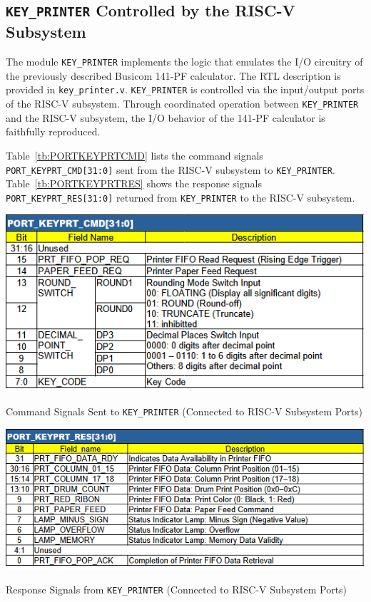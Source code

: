 \subsection{\texttt{KEY\_PRINTER} Controlled by the RISC-V Subsystem}
The module \texttt{KEY\_PRINTER} implements the logic that emulates the I/O circuitry of the previously described Busicom 141-PF calculator. The RTL description is provided in \texttt{key\_printer.v}. \texttt{KEY\_PRINTER} is controlled via the input/output ports of the RISC-V subsystem. Through coordinated operation between \texttt{KEY\_PRINTER} and the RISC-V subsystem, the I/O behavior of the 141-PF calculator is faithfully reproduced.

Table~\ref{tb:PORTKEYPRTCMD} lists the command signals \texttt{PORT\_KEYPRT\_CMD[31:0]} sent from the RISC-V subsystem to \texttt{KEY\_PRINTER}. Table~\ref{tb:PORTKEYPRTRES} shows the response signals \texttt{PORT\_KEYPRT\_RES[31:0]} returned from \texttt{KEY\_PRINTER} to the RISC-V subsystem.

\begin{table}[htbp]
    \includegraphics[width=0.75\columnwidth]{./Table/PORTKEYPRTCMD.png}
    \caption{Command Signals Sent to \texttt{KEY\_PRINTER} (Connected to RISC-V Subsystem Ports)}
    \label{tb:PORTKEYPRTCMD}
\end{table}
\begin{table}[htbp]
    \includegraphics[width=0.75\columnwidth]{./Table/PORTKEYPRTRES.png}
    \caption{Response Signals from \texttt{KEY\_PRINTER} (Connected to RISC-V Subsystem Ports)}
    \label{tb:PORTKEYPRTRES}
\end{table}

